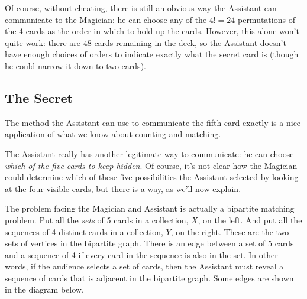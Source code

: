 Of course, without cheating, there is still an obvious way the Assistant
can communicate to the Magician: he can choose any of the $4! = 24$
permutations of the 4 cards as the order in which to hold up the cards.
However, this alone won't quite work: there are 48 cards remaining in the
deck, so the Assistant doesn't have enough choices of orders to indicate
exactly what the secret card is (though he could narrow it down to two
cards).

\subsection{The Secret}

The method the Assistant can use to communicate the fifth card exactly is
a nice application of what we know about counting and matching.

The Assistant really has another legitimate way to communicate: he can
choose \emph{which of the five cards to keep hidden}.  Of course, it's not
clear how the Magician could determine which of these five possibilities
the Assistant selected by looking at the four visible cards, but there is
a way, as we'll now explain.

The problem facing the Magician and Assistant is actually a bipartite
matching problem.  Put all the \emph{sets} of 5 cards in a collection,
$X$, on the left.  And put all the sequences of 4 distinct cards in a
collection, $Y$, on the right.  These are the two sets of vertices in the
bipartite graph.  There is an edge between a set of 5 cards and a sequence
of 4 if every card in the sequence is also in the set.  In other words, if
the audience selects a set of cards, then the Assistant must reveal a
sequence of cards that is adjacent in the bipartite graph.  Some edges are
shown in the diagram below.

